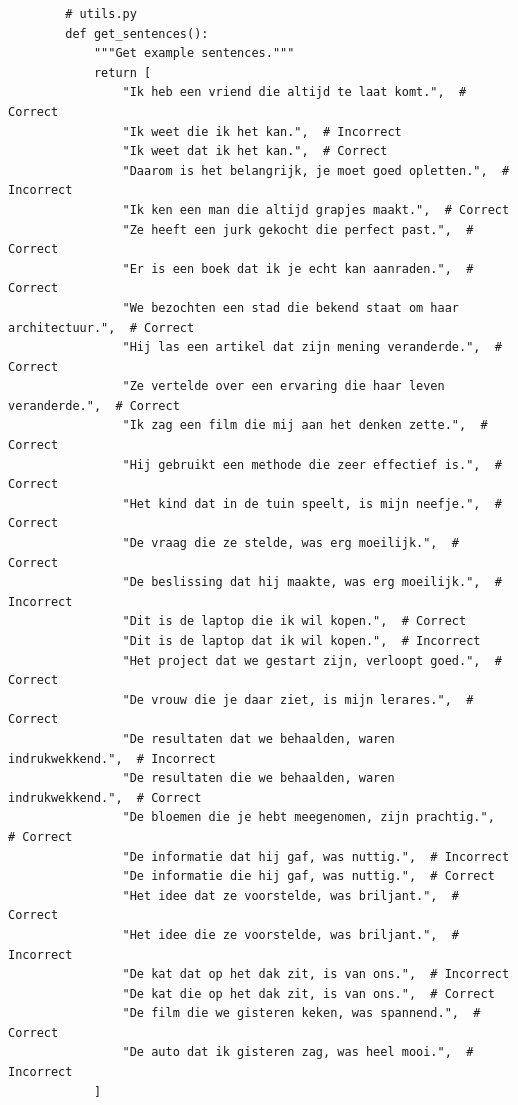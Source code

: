 \begin{listing}
    \begin{verbatim}
        # utils.py
        def get_sentences():
            """Get example sentences."""
            return [
                "Ik heb een vriend die altijd te laat komt.",  # Correct
                "Ik weet die ik het kan.",  # Incorrect
                "Ik weet dat ik het kan.",  # Correct
                "Daarom is het belangrijk, je moet goed opletten.",  # Incorrect
                "Ik ken een man die altijd grapjes maakt.",  # Correct
                "Ze heeft een jurk gekocht die perfect past.",  # Correct
                "Er is een boek dat ik je echt kan aanraden.",  # Correct
                "We bezochten een stad die bekend staat om haar architectuur.",  # Correct
                "Hij las een artikel dat zijn mening veranderde.",  # Correct
                "Ze vertelde over een ervaring die haar leven veranderde.",  # Correct
                "Ik zag een film die mij aan het denken zette.",  # Correct
                "Hij gebruikt een methode die zeer effectief is.",  # Correct
                "Het kind dat in de tuin speelt, is mijn neefje.",  # Correct
                "De vraag die ze stelde, was erg moeilijk.",  # Correct
                "De beslissing dat hij maakte, was erg moeilijk.",  # Incorrect
                "Dit is de laptop die ik wil kopen.",  # Correct
                "Dit is de laptop dat ik wil kopen.",  # Incorrect
                "Het project dat we gestart zijn, verloopt goed.",  # Correct
                "De vrouw die je daar ziet, is mijn lerares.",  # Correct
                "De resultaten dat we behaalden, waren indrukwekkend.",  # Incorrect
                "De resultaten die we behaalden, waren indrukwekkend.",  # Correct
                "De bloemen die je hebt meegenomen, zijn prachtig.",  # Correct
                "De informatie dat hij gaf, was nuttig.",  # Incorrect
                "De informatie die hij gaf, was nuttig.",  # Correct
                "Het idee dat ze voorstelde, was briljant.",  # Correct
                "Het idee die ze voorstelde, was briljant.",  # Incorrect
                "De kat dat op het dak zit, is van ons.",  # Incorrect
                "De kat die op het dak zit, is van ons.",  # Correct
                "De film die we gisteren keken, was spannend.",  # Correct
                "De auto dat ik gisteren zag, was heel mooi.",  # Incorrect
            ]
    \end{verbatim} 
    \caption[\texttt{get\_sentences}]{\texttt{get\_sentences}: Deze functie levert een lijst van voorbeeldzinnen die correct en incorrect gebruik van``die'' of ``dat'' illustreren. Deze zinnen worden gebruikt voor validatie en testing binnen de proof of concept.}
    \label{lst:getsentences}
\end{listing}

